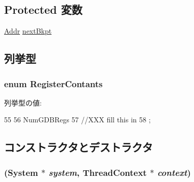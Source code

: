 \subsection*{Protected 変数}
\begin{DoxyCompactItemize}
\item 
\hyperlink{base_2types_8hh_af1bb03d6a4ee096394a6749f0a169232}{Addr} \hyperlink{classX86ISA_1_1RemoteGDB_a48116c182f6c43f3f31861355f288231}{nextBkpt}
\end{DoxyCompactItemize}


\subsection{列挙型}
\hypertarget{classX86ISA_1_1RemoteGDB_a9a48f761c00e727a19384b14f11b19d2}{
\subsubsection[{RegisterContants}]{\setlength{\rightskip}{0pt plus 5cm}enum {\bf RegisterContants}}}
\label{classX86ISA_1_1RemoteGDB_a9a48f761c00e727a19384b14f11b19d2}
\begin{Desc}
\item[列挙型の値: ]\par
\begin{description}
\item[{\em 
\hypertarget{classX86ISA_1_1RemoteGDB_a9a48f761c00e727a19384b14f11b19d2a811ff1e724004c1673663ccdea46e573}{
NumGDBRegs}
\label{classX86ISA_1_1RemoteGDB_a9a48f761c00e727a19384b14f11b19d2a811ff1e724004c1673663ccdea46e573}
}]\end{description}
\end{Desc}




\begin{DoxyCode}
55         {
56             NumGDBRegs
57             //XXX fill this in
58         };
\end{DoxyCode}


\subsection{コンストラクタとデストラクタ}
\hypertarget{classX86ISA_1_1RemoteGDB_a7d97c5a4edd8630299b2b0521ae32d98}{
\subsubsection[{RemoteGDB}]{ ({\bf System} $\ast$ {\em system}, \/  {\bf ThreadContext} $\ast$ {\em context})}}
\label{classX86ISA_1_1RemoteGDB_a7d97c5a4edd8630299b2b0521ae32d98}



